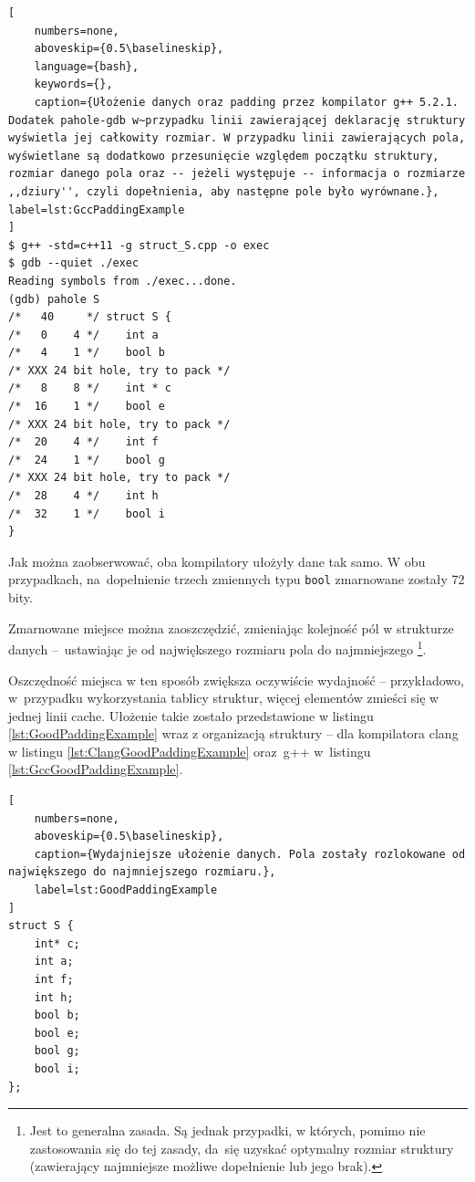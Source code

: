 \begin{lstlisting}[
    numbers=none,
    aboveskip={0.5\baselineskip},
    language={bash},
    keywords={},
    caption={Ułożenie danych oraz padding przez kompilator g++ 5.2.1.  Dodatek pahole-gdb w~przypadku linii zawierającej deklarację struktury wyświetla jej całkowity rozmiar. W przypadku linii zawierających pola, wyświetlane są dodatkowo przesunięcie względem początku struktury, rozmiar danego pola oraz -- jeżeli występuje -- informacja o rozmiarze ,,dziury'', czyli dopełnienia, aby następne pole było wyrównane.}, label=lst:GccPaddingExample
]   
$ g++ -std=c++11 -g struct_S.cpp -o exec
$ gdb --quiet ./exec
Reading symbols from ./exec...done.
(gdb) pahole S
/*   40     */ struct S {
/*   0    4 */    int a
/*   4    1 */    bool b
/* XXX 24 bit hole, try to pack */
/*   8    8 */    int * c
/*  16    1 */    bool e
/* XXX 24 bit hole, try to pack */
/*  20    4 */    int f
/*  24    1 */    bool g
/* XXX 24 bit hole, try to pack */
/*  28    4 */    int h
/*  32    1 */    bool i
} 
\end{lstlisting}

Jak można zaobserwować, oba kompilatory ułożyły dane tak samo. W obu przypadkach, na~dopełnienie trzech zmiennych typu \texttt{bool} zmarnowane zostały 72 bity.

Zmarnowane miejsce można zaoszczędzić, zmieniając kolejność pól w strukturze danych --~ustawiając je od największego rozmiaru pola do najmniejszego \footnote{Jest to generalna zasada. Są jednak przypadki, w których, pomimo nie zastosowania się do tej zasady, da~się uzyskać optymalny rozmiar struktury (zawierający najmniejsze możliwe dopełnienie lub jego brak).}.

Oszczędność miejsca w ten sposób zwiększa oczywiście wydajność -- przykładowo, w~przypadku wykorzystania tablicy struktur, więcej elementów zmieści się w jednej linii cache. Ułożenie takie zostało przedstawione w listingu \ref{lst:GoodPaddingExample} wraz z organizacją struktury -- dla kompilatora clang w listingu \ref{lst:ClangGoodPaddingExample} oraz~g++  w~listingu \ref{lst:GccGoodPaddingExample}.

\begin{lstlisting}[
    numbers=none,
    aboveskip={0.5\baselineskip},
    caption={Wydajniejsze ułożenie danych. Pola zostały rozlokowane od największego do najmniejszego rozmiaru.},
    label=lst:GoodPaddingExample
]
struct S {
	int* c;
	int a;
	int f;
	int h;
	bool b;
	bool e;
	bool g;
	bool i;
};
\end{lstlisting}


